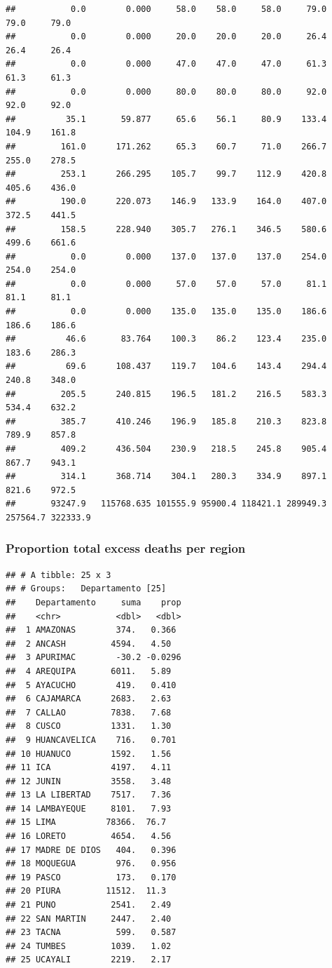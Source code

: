\documentclass[
]{article}
\begin{document}
\begin{verbatim}
##           0.0        0.000     58.0    58.0     58.0     79.0     79.0     79.0
##           0.0        0.000     20.0    20.0     20.0     26.4     26.4     26.4
##           0.0        0.000     47.0    47.0     47.0     61.3     61.3     61.3
##           0.0        0.000     80.0    80.0     80.0     92.0     92.0     92.0
##          35.1       59.877     65.6    56.1     80.9    133.4    104.9    161.8
##         161.0      171.262     65.3    60.7     71.0    266.7    255.0    278.5
##         253.1      266.295    105.7    99.7    112.9    420.8    405.6    436.0
##         190.0      220.073    146.9   133.9    164.0    407.0    372.5    441.5
##         158.5      228.940    305.7   276.1    346.5    580.6    499.6    661.6
##           0.0        0.000    137.0   137.0    137.0    254.0    254.0    254.0
##           0.0        0.000     57.0    57.0     57.0     81.1     81.1     81.1
##           0.0        0.000    135.0   135.0    135.0    186.6    186.6    186.6
##          46.6       83.764    100.3    86.2    123.4    235.0    183.6    286.3
##          69.6      108.437    119.7   104.6    143.4    294.4    240.8    348.0
##         205.5      240.815    196.5   181.2    216.5    583.3    534.4    632.2
##         385.7      410.246    196.9   185.8    210.3    823.8    789.9    857.8
##         409.2      436.504    230.9   218.5    245.8    905.4    867.7    943.1
##         314.1      368.714    304.1   280.3    334.9    897.1    821.6    972.5
##       93247.9   115768.635 101555.9 95900.4 118421.1 289949.3 257564.7 322333.9
\end{verbatim}

\hypertarget{proportion-total-excess-deaths-per-region}{%
\subsubsection{Proportion total excess deaths per region}\label{proportion-total-excess-deaths-per-region}}

\begin{verbatim}
## # A tibble: 25 x 3
## # Groups:   Departamento [25]
##    Departamento     suma    prop
##    <chr>           <dbl>   <dbl>
##  1 AMAZONAS        374.   0.366 
##  2 ANCASH         4594.   4.50  
##  3 APURIMAC        -30.2 -0.0296
##  4 AREQUIPA       6011.   5.89  
##  5 AYACUCHO        419.   0.410 
##  6 CAJAMARCA      2683.   2.63  
##  7 CALLAO         7838.   7.68  
##  8 CUSCO          1331.   1.30  
##  9 HUANCAVELICA    716.   0.701 
## 10 HUANUCO        1592.   1.56  
## 11 ICA            4197.   4.11  
## 12 JUNIN          3558.   3.48  
## 13 LA LIBERTAD    7517.   7.36  
## 14 LAMBAYEQUE     8101.   7.93  
## 15 LIMA          78366.  76.7   
## 16 LORETO         4654.   4.56  
## 17 MADRE DE DIOS   404.   0.396 
## 18 MOQUEGUA        976.   0.956 
## 19 PASCO           173.   0.170 
## 20 PIURA         11512.  11.3   
## 21 PUNO           2541.   2.49  
## 22 SAN MARTIN     2447.   2.40  
## 23 TACNA           599.   0.587 
## 24 TUMBES         1039.   1.02  
## 25 UCAYALI        2219.   2.17
\end{verbatim}
\end{document}
